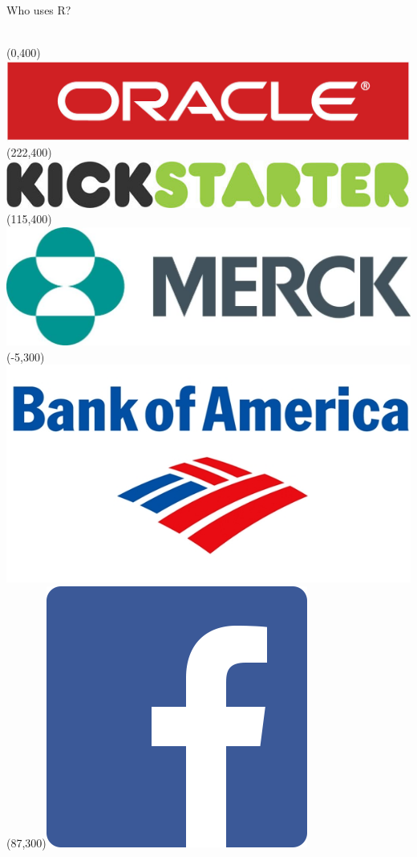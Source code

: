 \begin{frame}
\vspace{-.1cm}
\begin{block}{Who uses R?}
\ \\[6.5cm]\ 
\end{block}
\Put(0,400){\includegraphics[scale=1]{../common/pics/R_using_logos/oracle}}
\Put(222,400){\includegraphics[scale=.12]{../common/pics/R_using_logos/kickstarter}}
\Put(115,400){\includegraphics[scale=.1]{../common/pics/R_using_logos/merck}}
\Put(-5,300){\includegraphics[scale=.2]{../common/pics/R_using_logos/boa}}
\Put(87,300){\includegraphics[scale=.2]{../common/pics/R_using_logos/fb}}

\end{frame}
